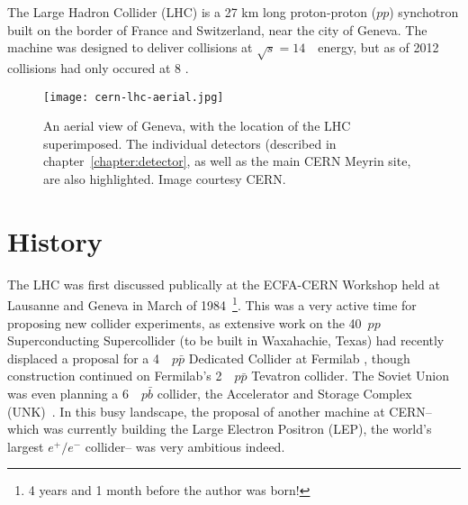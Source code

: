 \label{chapter:lhc}

The Large Hadron Collider (LHC) is a 27 km long proton-proton ($pp$) synchotron built on the border of France and Switzerland, near the city of Geneva. The machine was designed to deliver collisions at $\sqrt{s} = 14$~\TeV~energy, but as of 2012 collisions had only occured at 8 \TeV. 



\begin{figure}
\centering
\texttt{[image: cern-lhc-aerial.jpg]}
\label{fig:lhc:cern-lhc-aerial}
\caption{An aerial view of Geneva, with the location of the LHC superimposed. The individual detectors (described in chapter~\ref{chapter:detector}, as well as the main CERN Meyrin site, are also highlighted. Image courtesy CERN.}
\end{figure}


\section{History}
\label{lhc:history}

The LHC was first discussed publically at the ECFA-CERN Workshop held at Lausanne and Geneva in March of 1984~\cite{ECFA1984}\footnote{4 years and 1 month before the author was born!}. This was a very active time for proposing new collider experiments, as extensive work on the 40~\TeV $pp$ Superconducting Supercollider (to be built in Waxahachie, Texas) had recently displaced a proposal for a 4~\TeV~$p\bar{p}$ Dedicated Collider at Fermilab , though construction continued on Fermilab's 2~\TeV~$p\bar{p}$ Tevatron collider. The Soviet Union was even planning a 6~\TeV~$p\bar{b}$ collider, the Accelerator and Storage Complex (UNK)~\cite{UNK}. In this busy landscape, the proposal of another machine at CERN-- which was currently building the Large Electron Positron (LEP), the world's largest $e^+/e^-$ collider-- was very ambitious indeed.

